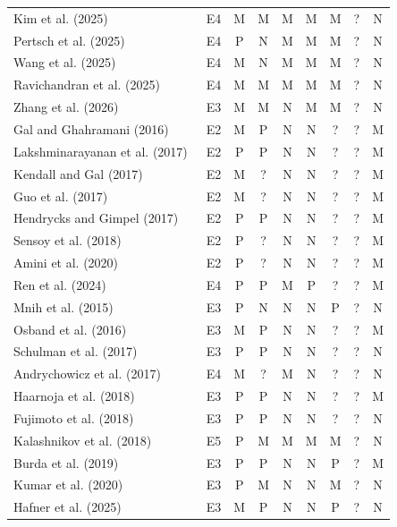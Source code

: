 \documentclass[10pt,a4paper]{article}
\begin{document}
\begin{longtable}{@{}>{\raggedright\arraybackslash}p{5.5cm}cccccccc@{}}
Kim et al. (2025)~\cite{Kim2025} & E4 & M & M & M & M & M & ? & N \\
Pertsch et al. (2025)~\cite{Pertsch2025} & E4 & P & N & M & M & M & ? & N \\
Wang et al. (2025)~\cite{Wang2025a} & E4 & M & N & M & M & M & ? & N \\
Ravichandran et al. (2025)~\cite{Ravichandran2025} & E4 & M & M & M & M & M & ? & N \\
Zhang et al. (2026)~\cite{Zhang2026a} & E3 & M & M & N & M & M & ? & N \\
Gal and Ghahramani (2016)~\cite{Gal2016} & E2 & M & P & N & N & ? & ? & M \\
Lakshminarayanan et al. (2017)~\cite{Lakshminarayanan2017} & E2 & P & P & N & N & ? & ? & M \\
Kendall and Gal (2017)~\cite{Kendall2017} & E2 & M & ? & N & N & ? & ? & M \\
Guo et al. (2017)~\cite{Guo2017} & E2 & M & ? & N & N & ? & ? & M \\
Hendrycks and Gimpel (2017)~\cite{Hendrycks2017} & E2 & P & P & N & N & ? & ? & M \\
Sensoy et al. (2018)~\cite{Sensoy2018} & E2 & P & ? & N & N & ? & ? & M \\
Amini et al. (2020)~\cite{Amini2020} & E2 & P & ? & N & N & ? & ? & M \\
Ren et al. (2024)~\cite{Ren2024} & E4 & P & P & M & P & ? & ? & M \\
Mnih et al. (2015)~\cite{Mnih2015} & E3 & P & N & N & N & P & ? & N \\
Osband et al. (2016)~\cite{Osband2016} & E3 & M & P & N & N & ? & ? & M \\
Schulman et al. (2017)~\cite{Schulman2017} & E3 & P & P & N & N & ? & ? & N \\
Andrychowicz et al. (2017)~\cite{Andrychowicz2017} & E4 & M & ? & M & N & ? & ? & N \\
Haarnoja et al. (2018)~\cite{Haarnoja2018} & E3 & P & P & N & N & ? & ? & M \\
Fujimoto et al. (2018)~\cite{Fujimoto2018} & E3 & P & P & N & N & ? & ? & N \\
Kalashnikov et al. (2018)~\cite{Kalashnikov2018} & E5 & P & M & M & M & M & ? & N \\
Burda et al. (2019)~\cite{Burda2019} & E3 & P & P & N & N & P & ? & M \\
Kumar et al. (2020)~\cite{Kumar2020} & E3 & P & M & N & N & M & ? & N \\
Hafner et al. (2025)~\cite{Hafner2023} & E3 & M & P & N & N & P & ? & N \\

\end{longtable}
\end{document}
